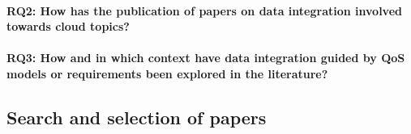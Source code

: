 \paragraph{\textbf{RQ2:}  How has the publication of papers on data integration
involved towards cloud topics?}
\paragraph{\textbf{RQ3:} How and in which context have data integration guided by QoS
models or requirements been explored in the literature?}


\subsection{Search and selection of papers} \label{subsec:search}


